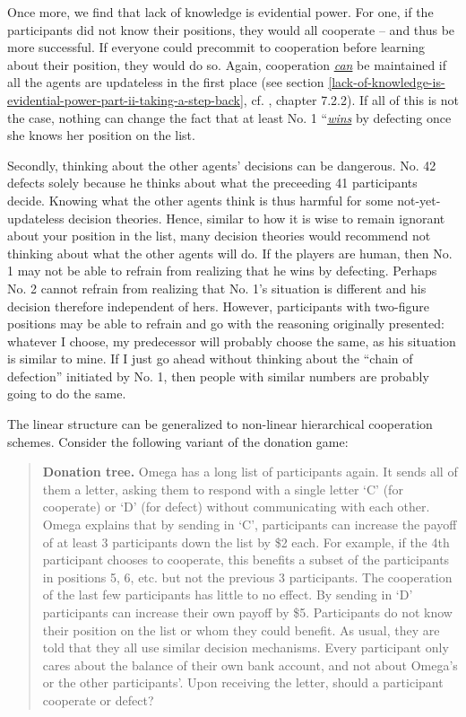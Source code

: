 Once more, we find that lack of knowledge is evidential power. For one,
if the participants did not know their positions, they would all
cooperate -- and thus be more successful. If everyone could precommit to
cooperation before learning about their position, they would do so.
Again, cooperation
\href{https://casparoesterheld.com/2016/11/21/thoughts-on-updatelessnes/}{\emph{can}}
be maintained if all the agents are updateless in the first place (see
section
\ref{lack-of-knowledge-is-evidential-power-part-ii-taking-a-step-back}, cf.
\cite{Drescher2006-ky}, chapter 7.2.2). If all of this is not the
case, nothing can change the fact that at least No. 1
``\href{https://wiki.lesswrong.com/wiki/Rationality_is_systematized_winning}{\emph{wins}}
by defecting once she knows her position on the list.

Secondly, thinking about the other agents' decisions can be dangerous.
No. 42 defects solely because he thinks about what the preceeding 41
participants decide. Knowing what the other agents think is thus harmful
for some not-yet-updateless decision theories. Hence, similar to how it
is wise to remain ignorant about your position in the list, many
decision theories would recommend not thinking about what the other
agents will do. If the players are human, then No. 1 may not be able to
refrain from realizing that he wins by defecting. Perhaps No. 2 cannot
refrain from realizing that No. 1's situation is different and his
decision therefore independent of hers. However, participants with
two-figure positions may be able to refrain and go with the reasoning
originally presented: whatever I choose, my predecessor will probably
choose the same, as his situation is similar to mine. If I just go ahead
without thinking about the ``chain of defection'' initiated by No. 1,
then people with similar numbers are probably going to do the same.

The linear structure can be generalized to non-linear hierarchical
cooperation schemes. Consider the following variant of the donation
game:

\begin{quote}
\textbf{Donation tree.} Omega has a long list of participants again. It
sends all of them a letter, asking them to respond with a single letter
`C' (for cooperate) or `D' (for defect) without communicating with each
other. Omega explains that by sending in `C', participants can increase
the payoff of at least 3 participants down the list by \$2 each. For
example, if the 4th participant chooses to cooperate, this benefits a
subset of the participants in positions 5, 6, etc. but not the previous
3 participants. The cooperation of the last few participants has little
to no effect. By sending in `D' participants can increase their own
payoff by \$5. Participants do not know their position on the list or
whom they could benefit. As usual, they are told that they all use
similar decision mechanisms. Every participant only cares about the
balance of their own bank account, and not about Omega's or the other
participants'. Upon receiving the letter, should a participant cooperate
or defect?
\end{quote}

